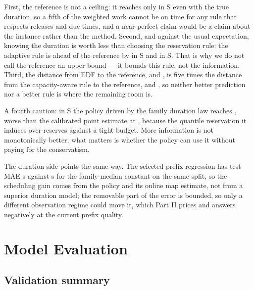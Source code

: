 \documentclass{swmcmthesis}
\begin{document}
First, the reference is not a ceiling: it reaches only \slotPStochSThreeOracleETA{} in
S\slotCaseThree{} even with the true duration, so a fifth of the weighted work cannot be
on time for any rule that respects releases and due times, and a near-perfect claim would
be a claim about the instance rather than the method. Second, and against the usual
expectation, knowing the duration is worth less than choosing the reservation rule: the
adaptive rule is ahead of the reference by \slotPInfoAdvSTwoAbs{} in S\slotCaseTwo{} and
\slotPInfoAdvSThreeAbs{} in S\slotCaseThree. That is why we do not call the reference an
upper bound --- it bounds this rule, not the information. Third, the distance from EDF to
the reference, \slotPStochPairSTwoEDFOldDiff{} and \slotPStochPairSThreeEDFOldDiff, is
five times the distance from the capacity-aware rule to the reference,
\slotPInfoGapSTwo{} and \slotPInfoGapSThree, so neither better prediction nor a better
rule is where the remaining room is.

A fourth caution: in S\slotCaseThree{} the policy driven by the family duration law
reaches \slotPInfoFamSThree{}, worse than the calibrated point estimate at
\slotPInfoFamPCSThree{}, because the quantile reservation it induces over-reserves
against a tight budget. More information is not monotonically better; what matters is
whether the policy can use it without paying for the conservatism.

The duration side points the same way. The selected prefix regression has test MAE
\slotPDurSelTestMAE{} s against \slotPDurFreeBaseMAE{} s for the family-median constant
on the same split, so the scheduling gain comes from the policy and its online map
estimate, not from a superior duration model; the removable part of the error is bounded,
so only a different observation regime could move it, which Part II prices and answers
negatively at the current prefix quality.

\section{Model Evaluation}
\label{sec:eval}

\subsection{Validation summary}
\end{document}
